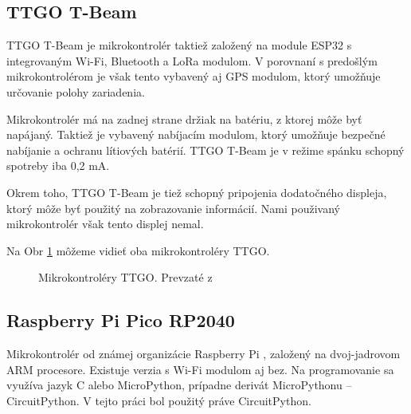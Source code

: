 \documentclass[slovak,master]{diploma}
\begin{document}
\subsection{TTGO T-Beam}
TTGO T-Beam je mikrokontrolér taktiež založený na module ESP32 s integrovaným Wi-Fi, Bluetooth a LoRa modulom. 
V porovnaní s predošlým mikrokontrolérom je však tento vybavený aj GPS modulom, ktorý umožňuje určovanie polohy zariadenia.

Mikrokontrolér má na zadnej strane držiak na batériu, z ktorej môže byť napájaný. Taktiež je vybavený nabíjacím modulom, 
ktorý umožňuje bezpečné nabíjanie a ochranu lítiových batérií. TTGO T-Beam je v režime spánku schopný spotreby iba 0,2 mA. 

Okrem toho, TTGO T-Beam je tiež schopný pripojenia dodatočného displeja, ktorý môže byť použitý na zobrazovanie informácií. 
Nami použivaný mikrokontrolér však tento displej nemal.

Na Obr \ref{fig:ttgo-moduly} môžeme vidieť oba mikrokontroléry TTGO.
\begin{figure}[h!]
  \centering
  \qquad
  \caption{Mikrokontroléry TTGO. Prevzaté z \cite{lilygo}}
  \label{fig:ttgo-moduly}
\end{figure}

\subsection{Raspberry Pi Pico RP2040}
Mikrokontrolér od známej organizácie Raspberry Pi \cite{rpiOrg}, založený na dvoj-jadrovom ARM procesore. 
Existuje verzia s Wi-Fi modulom aj bez. Na programovanie sa využíva jazyk C alebo MicroPython, 
prípadne derivát MicroPythonu -- CircuitPython. V tejto práci bol použitý práve CircuitPython.
\end{document}
